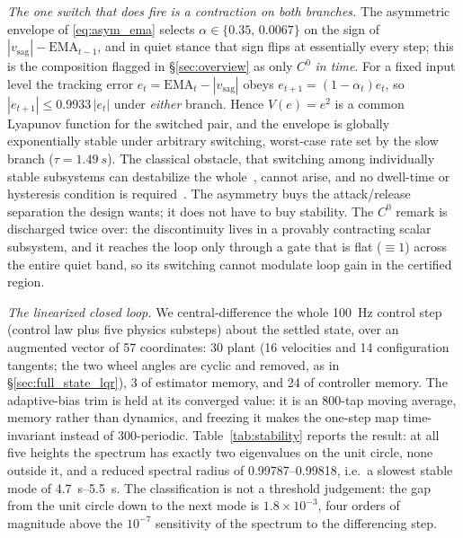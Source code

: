 \documentclass[conference]{IEEEtran}
\begin{document}
\emph{The one switch that does fire is a contraction on both branches.} The asymmetric envelope of \eqref{eq:asym_ema} selects $\alpha\in\{0.35,\,0.0067\}$ on the sign of $|v_{\text{sag}}|-\mathrm{EMA}_{t-1}$, and in quiet stance that sign flips at essentially every step; this is the composition flagged in \S\ref{sec:overview} as only $C^0$ \emph{in time}. For a fixed input level the tracking error $e_t=\mathrm{EMA}_t-|v_{\text{sag}}|$ obeys $e_{t+1}=(1-\alpha_t)e_t$, so $|e_{t+1}|\leq 0.9933\,|e_t|$ under \emph{either} branch. Hence $V(e)=e^2$ is a common Lyapunov function for the switched pair, and the envelope is globally exponentially stable under arbitrary switching, worst-case rate set by the slow branch ($\tau{=}\SI{1.49}{s}$). The classical obstacle, that switching among individually stable subsystems can destabilize the whole~\cite{liberzon2003switching}, cannot arise, and no dwell-time or hysteresis condition is required~\cite{hespanha2003hysteresis}. The asymmetry buys the attack/release separation the design wants; it does not have to buy stability. The $C^0$ remark is discharged twice over: the discontinuity lives in a provably contracting scalar subsystem, and it reaches the loop only through a gate that is flat ($\equiv 1$) across the entire quiet band, so its switching cannot modulate loop gain in the certified region.

\emph{The linearized closed loop.} We central-difference the whole \SI{100}{Hz} control step (control law plus five physics substeps) about the settled state, over an augmented vector of \num{57} coordinates: \num{30} plant (\num{16} velocities and \num{14} configuration tangents; the two wheel angles are cyclic and removed, as in \S\ref{sec:full_state_lqr}), \num{3} of estimator memory, and \num{24} of controller memory. The adaptive-bias trim is held at its converged value: it is an \num{800}-tap moving average, memory rather than dynamics, and freezing it makes the one-step map time-invariant instead of \num{300}-periodic. Table~\ref{tab:stability} reports the result: at all five heights the spectrum has exactly two eigenvalues on the unit circle, none outside it, and a reduced spectral radius of \numrange{0.99787}{0.99818}, i.e.\ a slowest stable mode of \SIrange{4.7}{5.5}{s}. The classification is not a threshold judgement: the gap from the unit circle down to the next mode is $1.8{\times}10^{-3}$, four orders of magnitude above the $10^{-7}$ sensitivity of the spectrum to the differencing step.
\end{document}
